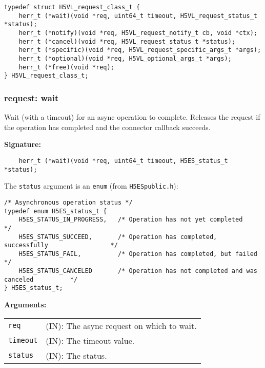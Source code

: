 \begin{lstlisting}[caption={Structure for async request callback routines, H5VLconnector.h}, captionpos=b, label={lst:Requestclass}]
typedef struct H5VL_request_class_t {
    herr_t (*wait)(void *req, uint64_t timeout, H5VL_request_status_t *status);
    herr_t (*notify)(void *req, H5VL_request_notify_t cb, void *ctx);
    herr_t (*cancel)(void *req, H5VL_request_status_t *status);
    herr_t (*specific)(void *req, H5VL_request_specific_args_t *args);
    herr_t (*optional)(void *req, H5VL_optional_args_t *args);
    herr_t (*free)(void *req);
} H5VL_request_class_t;
\end{lstlisting}

\subsubsection{request: wait}
Wait (with a timeout) for an async operation to complete. Releases the request if the operation has completed and the connector callback succeeds.

\begin{mdframed}[style=bgbox]
\textbf{Signature:}
\begin{lstlisting}
    herr_t (*wait)(void *req, uint64_t timeout, H5ES_status_t *status);          
\end{lstlisting}

The \texttt{status} argument is an \texttt{enum} (from \texttt{H5ESpublic.h}):
\begin{lstlisting}
/* Asynchronous operation status */                                              
typedef enum H5ES_status_t {                                                     
    H5ES_STATUS_IN_PROGRESS,   /* Operation has not yet completed                       */
    H5ES_STATUS_SUCCEED,       /* Operation has completed, successfully                 */
    H5ES_STATUS_FAIL,          /* Operation has completed, but failed                   */
    H5ES_STATUS_CANCELED       /* Operation has not completed and was canceled          */
} H5ES_status_t;
\end{lstlisting} 
    
\textbf{Arguments:}\\
\begin{tabular}{l p{13.5cm}}
  \texttt{req} & (IN): The async request on which to wait.\\
  \texttt{timeout} & (IN): The timeout value.\\
  \texttt{status} & (IN): The status.\\
\end{tabular}
\end{mdframed}

